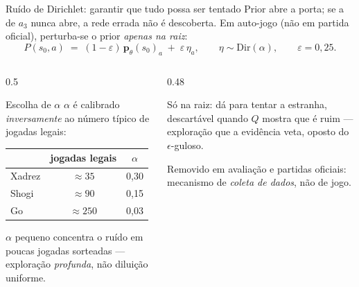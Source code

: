 \documentclass[aspectratio=169, 10pt]{beamer}
\newcommand{\redepol}{\bm{p}_{\theta}}
\begin{document}
\begin{frame}{Ruído de Dirichlet: garantir que tudo possa ser tentado}
  \footnotesize
  Prior abre a porta; se a de $a_3$ nunca abre, a rede errada não é descoberta. Em \alert{auto-jogo} (não em partida oficial), perturba-se o prior \emph{apenas na raiz}:
  \[
    P(s_0,a) \;=\; (1-\varepsilon)\,\redepol(s_0)_a \;+\; \varepsilon\,\eta_a,
    \qquad \eta \sim \mathrm{Dir}(\alpha),\qquad \varepsilon = 0{,}25 .
  \]

  \begin{columns}[T]
    \begin{column}{0.5\textwidth}
      \begin{defbox}{Escolha de $\alpha$}
        $\alpha$ é calibrado \emph{inversamente} ao número típico de jogadas
        legais:
        \smallskip
        \begin{center}\small
        \begin{tabular}{lcc}
          \toprule
          & jogadas legais & $\alpha$ \\ \midrule
          Xadrez & $\approx 35$  & 0,30 \\
          Shogi  & $\approx 90$  & 0,15 \\
          Go     & $\approx 250$ & 0,03 \\
          \bottomrule
        \end{tabular}
        \end{center}
        \smallskip
        $\alpha$ pequeno concentra o ruído em poucas jogadas sorteadas —
        exploração \emph{profunda}, não diluição uniforme.
      \end{defbox}
    \end{column}
    \begin{column}{0.48\textwidth}
      \begin{ideiabox}
        Só na raiz: dá para tentar a estranha, descartável quando $Q$ mostra que é ruim — exploração que a evidência veta, oposto do $\epsilon$-guloso.
      \end{ideiabox}
      \begin{alertabox}
        Removido em avaliação e partidas oficiais: mecanismo de \emph{coleta de dados}, não de jogo.
      \end{alertabox}
    \end{column}
  \end{columns}
\end{frame}
\end{document}
